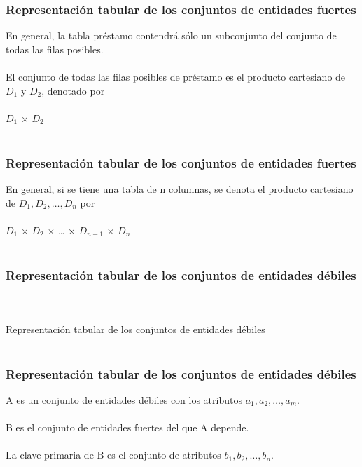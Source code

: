 \documentclass[t,24pt,aspectratio=169]{beamer}
\begin{document}
\begin{frame}
    \frametitle{Representación tabular de los conjuntos de entidades fuertes}
        \vfill
En general, la tabla préstamo contendrá sólo un subconjunto del conjunto de todas las filas posibles.
\\~\\
El conjunto de todas las filas posibles de préstamo es el producto cartesiano de $D_1$ y $D_2$, denotado por
\\~\\
$D_1$ × $D_2$
\\~\\
        \vfill
\end{frame}




\begin{frame}
    \frametitle{Representación tabular de los conjuntos de entidades fuertes}
        \vfill
En general, si se tiene una tabla de n columnas, se denota el producto cartesiano de $D_1, D_2,…,D_n$ por
\\~\\
$D_1$ × $D_2$ × … × $D_{n-1}$ × $D_n$
\\~\\
        \vfill
\end{frame}




\begin{frame}
    \frametitle{Representación tabular de los conjuntos de entidades débiles}
        \vfill
\centering
\\~\\
\Huge{Representación tabular de los conjuntos de entidades débiles}
\\~\\
        \vfill
\end{frame}




\begin{frame}
    \frametitle{Representación tabular de los conjuntos de entidades débiles}
        \vfill
A es un conjunto de entidades débiles con los atributos $a_1, a_2,…,a_m$. 
\\~\\
B es el conjunto de entidades fuertes del que A depende.
\\~\\
La clave primaria de B es el conjunto de atributos $b_1, b_2,…,b_n$.
\\~\\
        \vfill
\end{frame}
\end{document}
